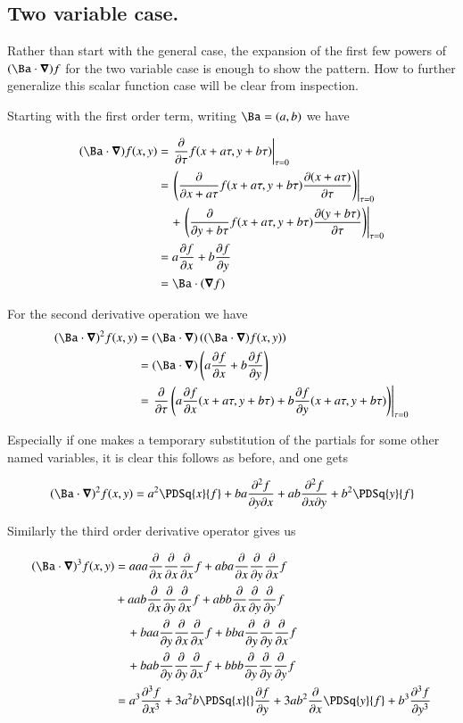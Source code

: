 \subsection{Two variable case. }

Rather than start with the general case, the expansion of the first few powers
of $(\Ba \cdot \spacegrad) f$ for the two variable case is enough to show the pattern.
How to further generalize this scalar function case will be clear from 
inspection.

Starting with the first order term, writing $\Ba = (a,b)$ we have

\begin{align*}
(\Ba \cdot \spacegrad) f(x,y) 
&= \left. \PD{\tau}{} f(x + a\tau, y + b\tau) \right\vert_{\tau=0} \\
&= 
\left. \left( \PD{x + a\tau}{} f(x + a\tau, y + b\tau) \PD{\tau}{(x + a\tau)} \right) \right\vert_{\tau=0} \\
&\quad+\left. \left( \PD{y + b\tau}{} f(x + a\tau, y + b\tau) \PD{\tau}{(y + b\tau)} \right) \right\vert_{\tau=0} \\
&= 
a \PD{x}{f} +b \PD{y}{f} \\
&= 
\Ba \cdot (\spacegrad f)
\end{align*}

For the second derivative operation we have
\begin{align*}
(\Ba \cdot \spacegrad)^2 f(x,y) 
&=
(\Ba \cdot \spacegrad) 
\left( (\Ba \cdot \spacegrad) f(x,y) \right) \\
&=
(\Ba \cdot \spacegrad) \left( a \PD{x}{f} +b \PD{y}{f} \right) \\
&= \left. \PD{\tau}{} \left( a \PD{x}{f}(x + a\tau, y + b\tau) + b \PD{y}{f}(x + a\tau, y + b\tau) \right) \right\vert_{\tau=0} \\
\end{align*}

Especially if one makes a temporary substitution of the partials for some other named variables, it is clear this follows as 
before, and one gets

\begin{align*}
(\Ba \cdot \spacegrad)^2 f(x,y) 
&=
a^2 \PDSq{x}{f} + b a \PDD{y}{x}{f} 
+a b \PDD{x}{y}{f} + b^2 \PDSq{y}{f} \\
\end{align*}

Similarly the third order derivative operator gives us

\begin{align*}
(\Ba \cdot \spacegrad)^3 f(x,y) 
&=
a a a \PD{x}{}\PD{x}{}\PD{x}{} f + a b a \PD{x}{}\PD{y}{}\PD{x}{}{f}  \\
\quad&+a a b \PD{x}{}\PD{y}{}\PD{x}{} f + a b b \PD{x}{}\PD{y}{}\PD{y}{}{f} \\
&\quad+b a a \PD{y}{}\PD{x}{}\PD{x}{} f + b b a \PD{y}{}\PD{y}{}\PD{x}{}{f} \\
&\quad+b a b \PD{y}{}\PD{y}{}\PD{x}{} f + b b b \PD{y}{}\PD{y}{}\PD{y}{}{f} \\
&=
a^3 \frac{\partial^3 f}{\partial x^3} 
+ 3 a^2 b \PDSq{x}{}\PD{y}{f}
+ 3 a b^2 \PD{x}{}\PDSq{y}{f} 
+b^3 \frac{\partial^3 f}{\partial y^3} 
\end{align*}

